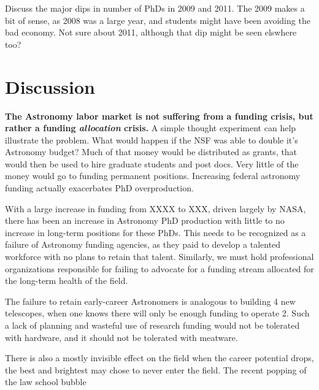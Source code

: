 \documentclass{emulateapj}
\begin{document}
Discuss the major dips in number of PhDs in 2009 and 2011.  The 2009 makes a bit of sense, as 2008 was a large year, and students might have been avoiding the bad economy.  Not sure about 2011, although that dip might be seen elswhere too?

\section{Discussion}

{\bf{The Astronomy labor market is not suffering from a funding crisis, but rather a funding {\emph{allocation}} crisis.}} A simple thought experiment can help illustrate the problem. What would happen if the NSF was able to double it's Astronomy budget? Much of that money would be distributed as grants, that would then be used to hire graduate students and post docs. Very little of the money would go to funding permanent positions. Increasing federal astronomy funding actually exacerbates PhD overproduction. 

With a large increase in funding from XXXX to XXX, driven largely by NASA, there has been an increase in Astronomy PhD production with little to no increase in long-term positions for these PhDs.  This needs to be recognized as a failure of Astronomy funding agencies, as they paid to develop a talented workforce with no plans to retain that talent. Similarly, we must hold professional organizations responsible for failing to advocate for a funding stream allocated for the long-term health of the field.  

The failure to retain early-career Astronomers is analogous to building 4 new telescopes, when one knows there will only be enough funding to operate 2.  Such a lack of planning and wasteful use of research funding would not be tolerated with hardware, and it should not be tolerated with meatware. 

There is also a mostly invisible effect on the field when the career potential drops, the best and brightest may chose to never enter the field.  The recent popping of the law school bubble %
\end{document}
